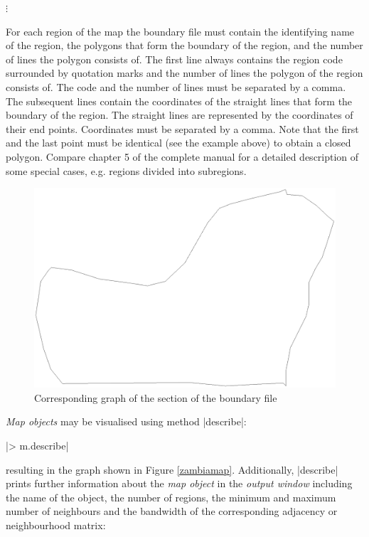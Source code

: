 \documentclass[a4paper]{article}
\begin{document}
\hspace{1cm} $\vdots$

\normalsize

\vspace{0.3cm}

For each region of the map the boundary file must contain the
identifying name of the region, the polygons that form the
boundary of the region, and the number of lines the polygon
consists of. The first line always contains the region code
surrounded by quotation marks and the number of lines the polygon
of the region consists of. The code and the number of lines must
be separated by a comma. The subsequent lines contain the
coordinates of the straight lines that form the boundary of the
region. The straight lines are represented by the coordinates of
their end points. Coordinates must be separated by a comma. Note
that the first and the last point must be identical (see the
example above) to obtain a closed polygon. Compare chapter 5 of
the complete manual for a detailed description of some special
cases, e.g. regions divided into subregions.

\begin{figure}[h]
\centering
\includegraphics [scale=0.3]{grafiken/zambia52.ps}
\caption{\label{zambia52} Corresponding graph of the section of
the boundary file}
\end{figure}

{\it Map objects} may be visualised using method |describe|:

|> m.describe|

resulting in the graph shown in Figure \ref{zambiamap}.
Additionally, |describe| prints further information about the {\it
map object} in the {\it output window} including the name of the
object, the number of regions, the minimum and maximum number of
neighbours and the bandwidth of the corresponding adjacency or
neighbourhood matrix:
\end{document}
